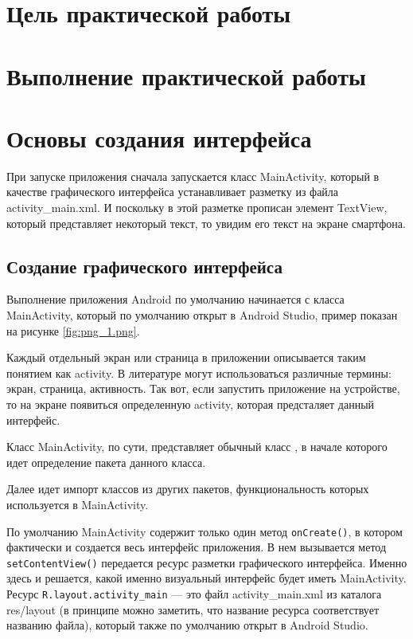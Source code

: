 \graphicspath{{./img}}
\section*{\LARGE{Цель практической работы}}

\newpage

\section*{\LARGE{Выполнение практической работы}}

\section{Основы создания интерфейса}
При запуске приложения сначала запускается класс
MainActivity, который в качестве графического интерфейса устанавливает
разметку из файла activity\_main.xml. И поскольку в этой разметке прописан
элемент TextView, который представляет некоторый текст, то увидим
его текст на экране смартфона.

\subsection{Создание графического интерфейса}
Выполнение приложения Android по умолчанию начинается с класса
MainActivity, который по умолчанию открыт в Android Studio,
пример показан на рисунке \ref{fig:png_1.png}.

Каждый отдельный экран или страница в приложении описывается таким
понятием как activity. В литературе могут использоваться различные
термины: экран, страница, активность.
Так вот, если запустить приложение на устройстве, то на экране появиться
определенную activity, которая предсталяет данный интерфейс.\par
Класс MainActivity, по сути, представляет обычный класс , в начале
которого идет определение пакета данного класса.\par
Далее идет импорт классов из других пакетов, функциональность которых
используется в MainActivity.\par
По умолчанию MainActivity содержит только один метод \texttt{onCreate()}, в
котором фактически и создается весь интерфейс приложения.
В нем вызывается метод \texttt{setContentView()} передается ресурс разметки
графического интерфейса.
Именно здесь и решается, какой именно визуальный интерфейс будет иметь
MainActivity. Ресурс \texttt{R.layout.activity\_main} --- это файл
activity\_main.xml из каталога res/layout (в
принципе можно заметить, что название ресурса соответствует названию
файла), который также по умолчанию открыт в Android Studio.

